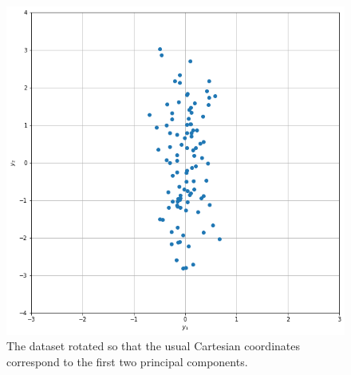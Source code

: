 \begin{figure}[htb]
	\centering
	\includegraphics[width=0.5\linewidth]{figures/pca_rotated}
	\caption{The dataset rotated so that the usual Cartesian coordinates
		correspond to the first two principal components.}
	\label{fig:pca_rotated}
\end{figure}

\begin{thebibliography}{9}



\end{thebibliography}







